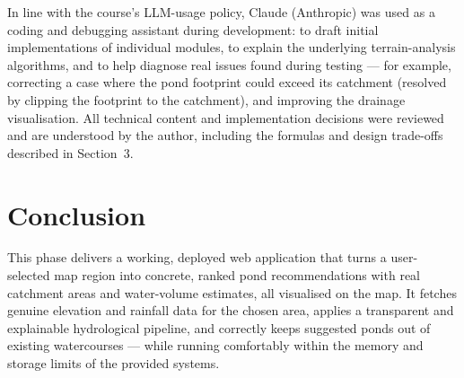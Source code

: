 \documentclass[11pt]{article}
\begin{document}
In line with the course's LLM-usage policy, Claude (Anthropic) was used as a coding
and debugging assistant during development: to draft initial implementations of
individual modules, to explain the underlying terrain-analysis algorithms, and to help
diagnose real issues found during testing --- for example, correcting a case where the
pond footprint could exceed its catchment (resolved by clipping the footprint to the
catchment), and improving the drainage visualisation. All technical content and
implementation decisions were reviewed and are understood by the author, including the
formulas and design trade-offs described in Section~3.

\section{Conclusion}

This phase delivers a working, deployed web application that turns a user-selected map
region into concrete, ranked pond recommendations with real catchment areas and
water-volume estimates, all visualised on the map. It fetches genuine elevation and
rainfall data for the chosen area, applies a transparent and explainable hydrological
pipeline, and correctly keeps suggested ponds out of existing watercourses --- while
running comfortably within the memory and storage limits of the provided systems.
\end{document}
